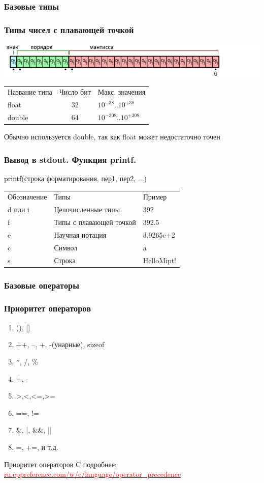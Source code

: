 \documentclass[14pt,pdf,hyperref={unicode}]{beamer}
\begin{document}
\begin{frame}
\frametitle{Базовые типы}
\frametitle{Типы чисел с плавающей точкой} 
\includegraphics[scale=0.6]{floats.png}
\begin{center}
\begin{tabular}{ l c l }
  Название типа & Число бит & Макс. значения \\
  float & 32 & $10^{-38}$..$10^{+38}$ \\
  double & 64 & $10^{-308}$..$10^{+308}$ \\
\end{tabular}
\end{center}
Обычно используется double, так как float может недостаточно точен
\end{frame}



\begin{frame}
\frametitle{Вывод в stdout. Функция printf.}
printf(строка форматирования, пер1, пер2, ...)
\begin{center}
\begin{tabular}{ l l l }
  Обозначение & Типы & Пример \\
  d или i & Целочисленные типы & 392 \\
  f & Типы с плавающей точкой & 392.5 \\
  e & Научная нотация & 3.9265e+2 \\
  c & Символ & a \\
  s & Строка & HelloMipt! \\
\end{tabular}
\end{center}
\end{frame}



\begin{frame}
\frametitle{Базовые операторы}
\frametitle{Приоритет операторов}
\begin{center}
\begin{enumerate}
\item (), []
\item ++, --, +, -(унарные), sizeof
\item *, /, \%
\item +, -
\item >,<,<=,>=
\item ==, !=
\item \&, |, \&\&, ||
\item =, +=, и т.д.
\end{enumerate}
\end{center}
Приоритет операторов C подробнее:\\
\href{http://ru.cppreference.com/w/c/language/operator_precedence}
{\textcolor{red}{ru.cppreference.com/w/c/language/operator\_precedence}}
\end{frame}
\end{document}
